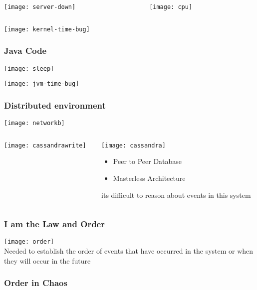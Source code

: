 \documentclass[aspectratio=169, 15pt,usenames,dvipsnames]{beamer}
\begin{document}
{\begin{gdblank}
\begin{columns}
			\begin{column}{0.5\textwidth}
				\texttt{[image: server-down]}				
			\end{column}
			\pause
			\begin{column}{0.5\textwidth}
				\texttt{[image: cpu]}
			\end{column}
		\end{columns}				
	\end{gdblank}  
	\begin{gdblank}		
		\texttt{[image: kernel-time-bug]}
	\end{gdblank}  
	\begin{gdblank}		
		\frametitle{Java Code}
		\texttt{[image: sleep]}
	\end{gdblank}   
	\begin{gdblank}
		\texttt{[image: jvm-time-bug]}
	\end{gdblank}
	\begin{gdblank}
		\frametitle{Distributed environment}
		\texttt{[image: networkb]}
	\end{gdblank}   
	\begin{gdblank}
		\begin{columns}
			\begin{column}{0.6\textwidth}
				\texttt{[image: cassandrawrite]}
			\end{column}
			\begin{column}{0.4\textwidth}
				\texttt{[image: cassandra]}
				\centering
				\begin{itemize}
					\item Peer to Peer Database
					\item Masterless Architecture
				\end{itemize}
				\tiny its difficult to reason about events in this system
			\end{column}
		\end{columns}
	\end{gdblank}   
	\begin{gdblank}
		\frametitle{I am the Law and Order}
		\centering
		\texttt{[image: order]}
		\\Needed to establish the order of events that have occurred in the system or when they will occur in the future
	\end{gdblank}
	\begin{gdblank}
		\frametitle{Order in Chaos}
		\LARGE
		\begin{itemize}

\end{itemize}
\end{gdblank}}
\end{document}
